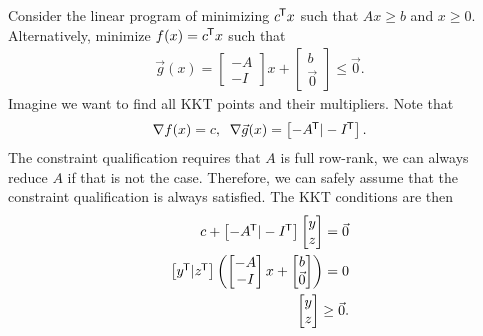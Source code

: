 \begin{exmp}
    Consider the linear program of minimizing ${c}^{\mkern-1.5mu\mathsf{T}}x$ such that $Ax \geq b$ and $x \geq 0$. Alternatively, minimize $f(x) = {c}^{\mkern-1.5mu\mathsf{T}}x$ such that
    \begin{align*}
        \vec{g}(x) = \begin{bmatrix}
            -A \\ -I
        \end{bmatrix}x + \begin{bmatrix}
            b \\ \vec{0}
        \end{bmatrix} \leq \vec{0}.
    \end{align*}
    Imagine we want to find all KKT points and their multipliers. Note that
    \begin{align*}
        \nabla f(x) = c,\;\;
        \nabla \vec{g}(x) = \begin{bmatrix}
            -{A}^{\mkern-1.5mu\mathsf{T}} | -{I}^{\mkern-1.5mu\mathsf{T}}
        \end{bmatrix}.
    \end{align*}
    The constraint qualification requires that $A$ is full row-rank, we can always reduce $A$ if that is not the case. Therefore, we can safely assume that the constraint qualification is always satisfied. The KKT conditions are then
    \begin{align*}
        c + \begin{bmatrix}
            -\transposeof{A} | -\transposeof{I}
        \end{bmatrix}\begin{bmatrix}
            y \\ z
        \end{bmatrix} = \vec{0} \\
        \begin{bmatrix}
            \transposeof{y} | \transposeof{z}
        \end{bmatrix}\left(\begin{bmatrix}
            -A \\ -I
        \end{bmatrix}x + \begin{bmatrix}
            b \\ \vec{0}
        \end{bmatrix}\right) = 0 \\
        \begin{bmatrix}
            y \\ z
        \end{bmatrix} \geq \vec{0}.

\end{align*}
\end{exmp}
